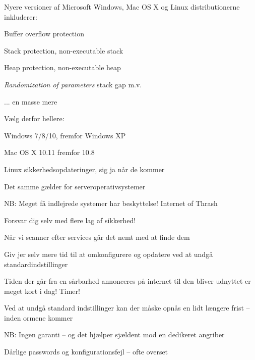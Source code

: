 \documentclass[Screen16to9,17pt]{foils}
\begin{document}
\begin{list1}
\item Nyere versioner af Microsoft Windows, Mac OS X og Linux distributionerne inkluderer:
\begin{list2}
\item Buffer overflow protection
\item Stack protection, non-executable stack
\item Heap protection, non-executable heap
\item \emph{Randomization of parameters} stack gap m.v.
\item ... en masse mere
\end{list2}
\item Vælg derfor hellere:
\begin{list2}
\item Windows 7/8/10, fremfor Windows XP
\item Mac OS X 10.11 fremfor 10.8
\item Linux sikkerhedsopdateringer, sig ja når de kommer
\end{list2}
\item Det samme gælder for serveroperativsystemer
\item NB: Meget få indlejrede systemer har beskyttelse! Internet of Thrash
\end{list1}



\centerline{Forsvar dig selv med flere lag af sikkerhed! }



\begin{list1}
\item Når vi scanner efter services går det nemt med at finde dem
\item Giv jer selv mere tid til at omkonfigurere og opdatere ved at undgå standardindstillinger
\item Tiden der går fra en sårbarhed annonceres på internet til den
  bliver udnyttet er meget kort i dag! Timer!
\item Ved at undgå standard indstillinger kan der
  måske opnås en lidt længere frist -- inden ormene kommer
\item NB: Ingen garanti -- og det hjælper sjældent mod en dedikeret angriber
\item Dårlige passwords og konfigurationsfejl -- ofte overset
\end{list1}
\end{document}
